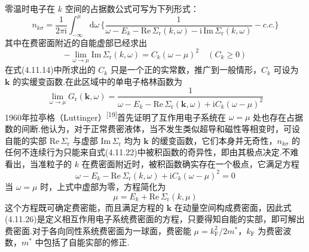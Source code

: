 零温时电子在 $k$ 空间的占据数公式可写为下列形式：
\begin{equation}
  n_{k\sigma}=\frac{1}{2\pi\mathrm{i}}\int_{-\infty}^{\mu}\mathrm{d}\omega\,
  \bigg\{\frac{1}{\omega-E_{k}-\mathrm{Re}\,\varSigma_{\mathrm{r}}(k,\omega)
  -\mathrm{i}\,\mathrm{Im}\,\varSigma_{\mathrm{r}}(k,\omega)}
  -c.c.\bigg\}
\end{equation}
其中在费密面附近的自能虚部已经求出
\begin{equation}
  -\lim_{\omega\to\mu}\mathrm{Im}\,\varSigma_{\mathrm{r}}(k,\omega)
  =C_{k}\left(\omega-\mu\right)^{2}\quad\left(C_{k}\geqslant 0\right)
\end{equation}
在式(4.11.14)中所求出的 $C_{k}$ 只是一个正的实常数，推广到一般情形，$C_{k}$ 可设为 $\boldsymbol{k}$ 的实缓变函数.在此区域中的单电子格林函数为
\begin{equation}
  \lim_{\omega\to\mu}G_{\mathrm{r}}(\boldsymbol{k},\omega)
  =\frac{1}{\omega-E_{k}-\mathrm{Re}\,\varSigma_{\mathrm{r}}(\boldsymbol{k},\omega)
  +\mathrm{i}C_{k}\left(\omega-\mu\right)^{2}}
\end{equation}
1960年拉亭格（Luttinger）\textsuperscript{[19]}首先证明了互作用电子系统在 $\omega=\mu$ 处也存在占据数的间断.他认为，对于正常费密液体，当不发生类似超导和磁性等相变时，可设自能的实部 $\mathrm{Re}\,\varSigma_{\mathrm{r}}$ 与虚部 $\mathrm{Im}\,\varSigma_{\mathrm{r}}$ 均为 $\boldsymbol{k}$ 的缓变函数，它们本身并无奇性，$n_{k\sigma}$ 的任何不连续行为只能来自式(4.11.22)中被积函数的奇异性，即由其极点决定.不难看出，当准粒子的 $k$ 在费密面附近时，被积函数确实存在一个极点，它满足方程
\begin{equation}
  \omega-E_{k}-\mathrm{Re}\,\varSigma_{\mathrm{r}}(k,\omega)
  +\mathrm{i}C_{k}\left(\omega-\mu\right)^{2}=0
\end{equation}
当 $\omega=\mu$ 时，上式中虚部为零，方程简化为
\begin{equation}
  \mu=E_{k}+\mathrm{Re}\,\varSigma_{\mathrm{r}}(k,\mu)
\end{equation}
这个方程既可确定费密能，而且满足方程的 $\boldsymbol{k}$ 在动量空间构成费密面，因此式(4.11.26)是定义相互作用电子系统费密面的方程，只要得知自能的实部，即可解出费密面.对于各向同性系统费密面为一球面，费密能 $\mu=k_{\mathrm{F}}^{2}/2m^{*}$，$k_{\mathrm{F}}$ 为费密波数，$m^{*}$ 中包括了自能实部的修正.

